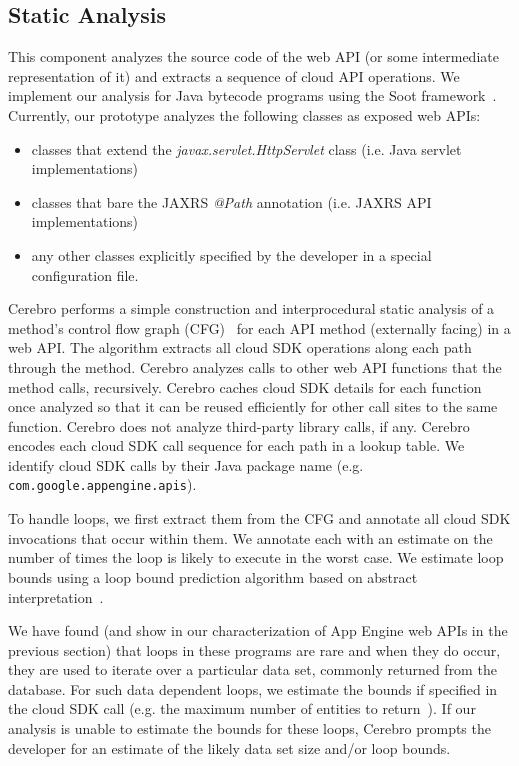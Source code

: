 \subsection{Static Analysis}
 This component analyzes the source code of the web API
(or some intermediate representation of it) and extracts a sequence of cloud API operations.
We implement our analysis for Java bytecode programs
using the Soot framework~\cite{Vallee-Rai:2010:SJB:1925805.1925818}.
Currently, our prototype analyzes the following classes as exposed web APIs:
\begin{itemize}
\item classes that extend the \textit{javax.servlet.HttpServlet} class (i.e. Java servlet implementations)
\item classes that bare the JAXRS \textit{@Path} annotation (i.e. JAXRS API implementations)
\item any other classes explicitly specified by the developer in a special configuration file.
\end{itemize}

Cerebro performs a simple construction and interprocedural static analysis 
of a method's control flow graph 
(CFG)~\cite{Allen:1970:CFA:800028.808479,Aho:1986:CPT:6448,Morgan:1998:BOC:288765,Muchnick:1998:ACD:286076} for each API method (externally facing) in a web API. 
The algorithm extracts all cloud SDK operations along
each path through the method.  Cerebro analyzes calls to other web API functions
that the method calls, recursively.  Cerebro caches cloud SDK details for each function 
once analyzed so that it can be reused efficiently for other call sites to the same
function. Cerebro does not analyze third-party library calls, if any.  Cerebro encodes
each cloud SDK call sequence for each path in a lookup table. We identify
cloud SDK calls by their Java package name (e.g. \texttt{com.google.appengine.apis}).

To handle loops, we first extract them from the CFG and 
annotate all cloud SDK invocations that occur within them.
We annotate each with an estimate on the number of times
the loop is likely to execute in the worst case. 
We estimate loop bounds using a loop bound prediction algorithm 
based on abstract interpretation~\cite{bygde2010static}. 


We have found (and show in our characterization of App Engine web APIs in the previous
section) that loops in these programs are rare and when they do occur, they are
used to iterate over a particular data set, commonly returned from the database.
For such data dependent loops, we estimate the bounds if specified 
in the cloud SDK call (e.g. the maximum number of 
entities to return~\cite{gae-fetch-options}).
If our analysis is unable to estimate the bounds for these loops, Cerebro prompts
the developer for an estimate of the likely data set size and/or loop bounds.


